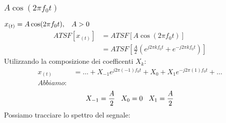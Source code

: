             \subsubsection{$A\cos(2\pi f_0 t)$}
                $x_{(t)}=A\cos(2\pi f_0 t), \hspace{0.3cm} A>0$
                \begin{align}
                    ATSF[x_{(t)}] & = ATSF[A\cos(2\pi f_0 t)] \nonumber \\
                        & = ATSF[\frac{A}{2} (e^{j2\pi kf_0t} + e^{-j2\pi kf_0t})] \nonumber 
                \end{align}
                Utilizzando la composizione dei coefficenti $X_k$:
                \begin{align}
                    x_{(t)} & =\ldots  + X_{-1} e^{j2\pi (-1)f_0t} + X_{0} + X_{1} e^{-j2\pi (1) f_0t} + \ldots \nonumber\\
                    Abbiamo:& \nonumber 
                \end{align}
                        \[X_{-1} = \frac{A}{2}\hspace{.3cm} X_{0} = 0\hspace{.3cm} X_{1} = \frac{A}{2}\] 
                Possiamo tracciare lo spettro del segnale:
